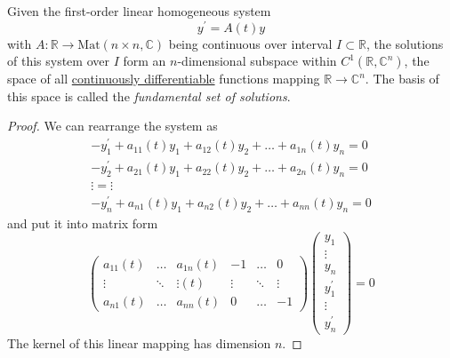 \documentclass{article}
\newcounter{theorem}[section]
\begin{document}
      \begin{theorem}
        \label{thm:fundamental-set-of-solutions}
      Given the first-order linear homogeneous system 
      \begin{equation}
        y^\prime = A(t) y
      \end{equation}
      with $A: \mathbb{R} \to \text{Mat}(n \times n, \mathbb{C})$ being continuous over interval $I \subset \mathbb{R}$, the solutions of this system over $I$ form an $n$-dimensional subspace within $C^1(\mathbb{R}, \mathbb{C}^n)$, the space of all \hyperref[mv-def:continuously-differentiable]{continuously differentiable} functions mapping $\mathbb{R} \to \mathbb{C}^n$. The basis of this space is called the \textit{fundamental set of solutions}. 
      \end{theorem}
      \begin{proof}
      We can rearrange the system as 
      \begin{align*}
          -y_1^\prime + a_{11}(t) y_1 + a_{12}(t) y_2 + \ldots + a_{1n}(t) y_n = 0 \\
          -y_2^\prime + a_{21}(t) y_1 + a_{22}(t) y_2 + \ldots + a_{2n}(t) y_n = 0 \\
          \vdots = \vdots \\
          -y_n^\prime + a_{n1}(t) y_1 + a_{n2}(t) y_2 + \ldots + a_{nn}(t) y_n = 0 
      \end{align*}
      and put it into matrix form
      \begin{equation}
        \begin{pmatrix}
              a_{11}(t) & \ldots & a_{1n} (t) & -1 & \ldots & 0 \\
              \vdots & \ddots &\vdots (t) & \vdots & \ddots& \vdots \\
              a_{n1}(t) & \ldots & a_{nn} (t) & 0 & \ldots & -1
              \end{pmatrix} \begin{pmatrix}y_1  \\ \vdots \\ y_n \\ y_1^\prime \\ \vdots \\ y_n^\prime \end{pmatrix} = 0
      \end{equation}
      The kernel of this linear mapping has dimension $n$. 
      \end{proof}
\end{document}
